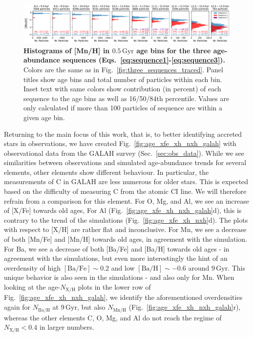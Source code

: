 \documentclass[fleqn,usenatbib]{mnras}
\begin{document}
\begin{figure}
	\includegraphics[width=\textwidth]{figures/histograms_xh_in_age_bins_Mn.pdf}
    \caption{
    \textbf{Histograms of {[Mn/H]} in $0.5\,\mathrm{Gyr}$ age bins for the three age-abundance sequences (Eqs.~\ref{eq:sequence1}-\ref{eq:sequence3}).} Colors are the same as in Fig.~\ref{fig:three_sequences_traced}. Panel titles show age bins and total number of particles within each bin. Inset text with same colors show contribution (in percent) of each sequence to the age bins as well as 16/50/84th percentile. Values are only calculated if more than 100 particles of sequence are within a given age bin.}
    \label{fig:histograms_xh_in_age_bins_Mn}
\end{figure}

Returning to the main focus of this work, that is, to better identifying accreted stars in observations, we have created Fig.~\ref{fig:age_xfe_xh_nxh_galah} with observational data from the GALAH survey (Sec.~\ref{sec:obs_data}). While we see similarities between observations and simulated age-abundance trends for several elements, other elements show different behaviour. In particular, the measurements of C in GALAH are less numerous for older stars. This is expected based on the difficulty of measuring C from the atomic CI line. We will therefore refrain from a comparison for this element. For O, Mg, and Al, we see an increase of [X/Fe] towards old ages, For Al (Fig.~\ref{fig:age_xfe_xh_nxh_galah}d), this is contrary to the trend of the simulations (Fig.~\ref{fig:age_xfe_xh_nxh}d). The plots with respect to [X/H] are rather flat and inconclusive. For Mn, we see a decrease of both [Mn/Fe] and [Mn/H] towards old ages, in agreement with the simulation. For Ba, we see a decrease of both [Ba/Fe] and [Ba/H] towards old ages - in agreement with the simulations, but even more interestingly the hint of an overdensity of high $\mathrm{[Ba/Fe]} \sim 0.2$ and low $\mathrm{[Ba/H]} \sim -0.6$ around $9\,\mathrm{Gyr}$. This unique behavior is also seen in the simulations - and also only for Mn. When looking at the age-$N_\mathrm{X/H}$ plots in the lower row of Fig.~\ref{fig:age_xfe_xh_nxh_galah}, we identify the aforementioned overdensities again for $N_\mathrm{Ba/H}$ at $9\,\mathrm{Gyr}$, but also $N_\mathrm{Mn/H}$ (Fig.~\ref{fig:age_xfe_xh_nxh_galah}r), whereas the other elements C, O, Mg, and Al do not reach the regime of $N_\mathrm{X/H} < 0.4$ in larger numbers.
\end{document}
